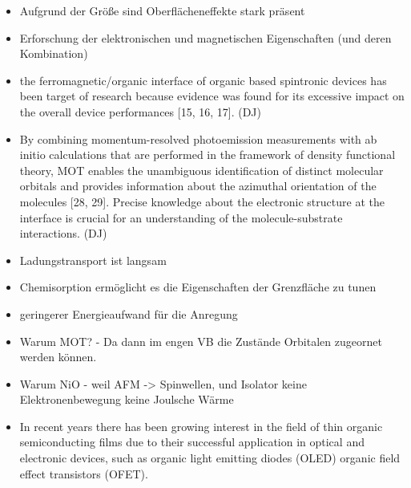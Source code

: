 \begin{itemize}
    \item Aufgrund der Größe sind Oberflächeneffekte stark präsent
    \item Erforschung der elektronischen und magnetischen Eigenschaften (und deren Kombination)
    \item the ferromagnetic/organic interface of organic based spintronic devices has been target of research because evidence was found for its excessive impact on the overall device performances [15, 16, 17]. (DJ)
    \item By combining momentum-resolved photoemission measurements with ab initio calculations that are performed in the framework of density functional theory, MOT enables the unambiguous identification of distinct molecular orbitals and provides information about the azimuthal orientation of the molecules [28, 29]. Precise knowledge about the electronic structure at the interface is crucial for an understanding of the molecule-substrate interactions. (DJ)
    \item Ladungstransport ist langsam
    \item Chemisorption ermöglicht es die Eigenschaften der Grenzfläche zu tunen
    \item geringerer Energieaufwand für die Anregung
    \item Warum MOT? - Da dann im engen VB die Zustände Orbitalen zugeornet werden können.
    \item Warum NiO - weil AFM -> Spinwellen, und Isolator keine Elektronenbewegung keine Joulsche Wärme
    \item In recent years there has been growing interest in the field of thin organic semiconducting films due to their successful application in optical and electronic devices, such as organic light emitting diodes (OLED) organic field effect transistors (OFET). \cite{Uni-Tübingen}

\end{itemize}

